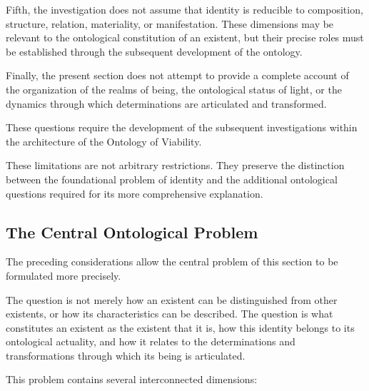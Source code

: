 Fifth, the investigation does not assume
that identity is reducible to composition,
structure, relation, materiality, or
manifestation. These dimensions may be
relevant to the ontological constitution
of an existent, but their precise roles
must be established through the subsequent
development of the ontology.

Finally, the present section does not
attempt to provide a complete account
of the organization of the realms of being,
the ontological status of light, or the
dynamics through which determinations
are articulated and transformed.

These questions require the development
of the subsequent investigations within
the architecture of the Ontology of Viability.

These limitations are not arbitrary restrictions.
They preserve the distinction between the
foundational problem of identity and the
additional ontological questions required
for its more comprehensive explanation.



\subsection{The Central Ontological Problem}

The preceding considerations allow the
central problem of this section to be
formulated more precisely.

The question is not merely how an existent
can be distinguished from other existents,
or how its characteristics can be described.
The question is what constitutes an existent
as the existent that it is, how this identity
belongs to its ontological actuality, and
how it relates to the determinations and
transformations through which its being
is articulated.

This problem contains several interconnected
dimensions:

